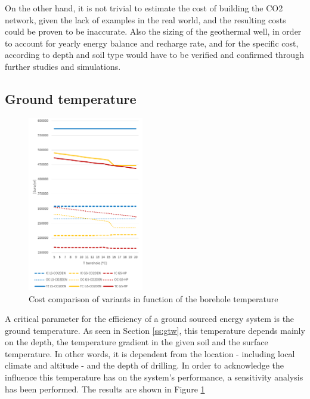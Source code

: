 \documentclass{article}
\begin{document}
On the other hand, it is not trivial to estimate the cost of building the CO2 network, given the lack of examples in the real world, and the resulting costs could be proven to be inaccurate. Also the sizing of the geothermal well, in order to account for yearly energy balance and recharge rate, and for the specific cost, according to depth and soil type would have to be verified and confirmed through further studies and simulations.


\subsection{Ground temperature}


\begin{figure} 
	\vspace{-20pt}
	\centering
	\includegraphics[width=0.45\textwidth]{V_SA_Tg.png}
	\caption{Cost comparison of variants in function of the borehole temperature}
	\label{fig:V_SA_Tg}
	\vspace{-10pt}
\end{figure}

A critical parameter for the efficiency of a ground sourced energy system is the ground temperature. As seen in Section \ref{ss:gtw}, this temperature depends mainly on the depth, the temperature gradient in the given soil and the surface temperature. In other words, it is dependent from the location - including local climate and altitude - and the depth of drilling. In order to acknowledge the influence this temperature has on the system's performance, a sensitivity analysis has been performed. The results are shown in Figure \ref{fig:V_SA_Tg}
\end{document}
